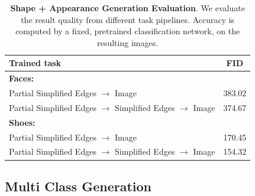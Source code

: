 \begin{table}[t]
\resizebox{1.\linewidth}{!} {
    \centering
        \begin{tabular}{l c}
        \toprule
        \textbf{Trained task} & \textbf{FID} \\ \midrule
        \textbf{Faces:}\\ \hline
        Partial Simplified Edges $\rightarrow$ Image & 383.02 \\
        Partial Simplified Edges $\rightarrow$ Simplified Edges $\rightarrow$ Image & 374.67 \\
        \hline
        \textbf{Shoes:}\\ \hline
        Partial Simplified Edges $\rightarrow$ Image & 170.45 \\
        Partial Simplified Edges $\rightarrow$ Simplified Edges $\rightarrow$ Image & 154.32 \\
        \bottomrule %
        \end{tabular}
        }
    \caption{\label{table:2step_eval_single_class} \textbf{Shape + Appearance Generation Evaluation}. We evaluate the result quality from different task pipelines. Accuracy is computed by a fixed, pretrained classification network, on the resulting images.
    }
\end{table}


\subsection{Multi Class Generation} 
